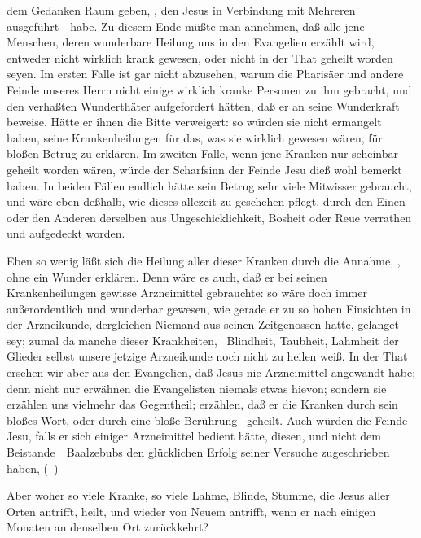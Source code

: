 \begin{aufza}
\begin{aufzb}
\item dem Gedanken Raum geben, , den Jesus in Verbindung mit Mehreren ausgeführt~\ habe. Zu diesem Ende müßte man annehmen, daß alle jene Menschen, deren wunderbare Heilung uns in den Evangelien erzählt wird, entweder nicht wirklich krank gewesen, oder nicht in der That geheilt worden seyen. Im ersten Falle ist gar nicht abzusehen, warum die Pharisäer und andere Feinde unseres Herrn nicht einige wirklich kranke Personen zu ihm gebracht, und den verhaßten Wunderthäter aufgefordert hätten, daß er an  seine Wunderkraft beweise. Hätte er ihnen die Bitte verweigert: so würden sie nicht ermangelt haben, seine Krankenheilungen für das, was sie wirklich gewesen wären, für bloßen Betrug zu erklären. Im zweiten Falle, wenn jene Kranken nur scheinbar geheilt worden wären, würde der Scharfsinn der Feinde Jesu dieß wohl bemerkt haben. In beiden Fällen endlich hätte sein Betrug sehr viele Mitwisser gebraucht, und wäre eben deßhalb, wie dieses allezeit zu geschehen pflegt, durch den Einen oder den Anderen derselben aus Ungeschicklichkeit, Bosheit oder Reue verrathen und aufgedeckt worden.
\item Eben so wenig läßt sich die Heilung aller dieser Kranken durch die Annahme, , ohne ein Wunder erklären. Denn wäre es auch, daß er bei seinen Krankenheilungen gewisse Arzneimittel gebrauchte: so wäre doch immer  außerordentlich und wunderbar gewesen, wie gerade er zu so hohen Einsichten in der Arzneikunde, dergleichen Niemand aus seinen Zeitgenossen hatte, gelanget sey; zumal da manche dieser Krankheiten, \zB\ Blindheit, Taubheit, Lahmheit der Glieder selbst unsere jetzige Arzneikunde noch nicht zu heilen weiß. In der That ersehen wir aber aus den Evangelien, daß Jesus nie Arzneimittel angewandt habe; denn nicht nur erwähnen die Evangelisten niemals etwas hievon; sondern sie erzählen uns vielmehr das Gegentheil; erzählen, daß er die Kranken durch sein bloßes Wort, oder durch eine bloße Berührung \udgl\  geheilt. Auch würden die Feinde Jesu, falls er sich einiger Arzneimittel bedient hätte, diesen, und nicht dem Beistande~\ Baalzebubs den glücklichen Erfolg seiner Versuche zugeschrieben haben, (\ )
\item[\RWbet{Einwurf.}] Aber woher so viele Kranke, so viele Lahme, Blinde, Stumme, die Jesus aller Orten antrifft, heilt, und wieder von Neuem antrifft, wenn er nach einigen Monaten an denselben Ort zurückkehrt?

\end{aufzb}
\end{aufza}
